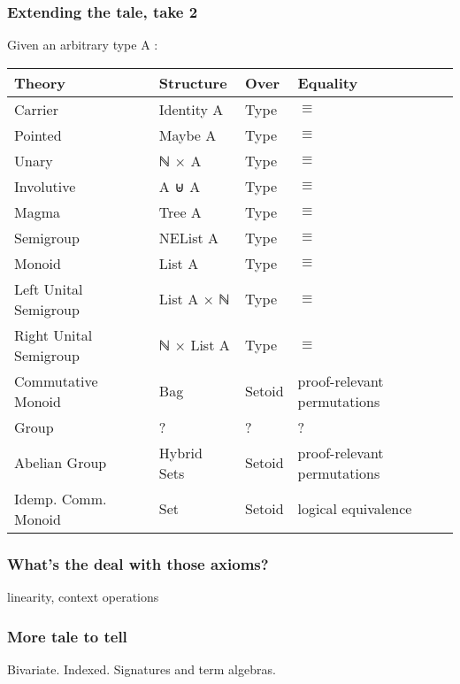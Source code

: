\documentclass[serif,mathserif,professionalfont,10pt]{beamer}
\begin{document}
\begin{frame}
\frametitle{Extending the tale, take 2}
Given an arbitrary type A : \\ \vspace*{4mm}
\begin{tabular}{llll}
\textbf{Theory} & \textbf{Structure} & Over & Equality \\ \hline
Carrier & Identity A & Type  & $\equiv$ \\
Pointed & Maybe A & Type & $\equiv$\\ \hline
Unary & ℕ × A &  Type & $\equiv$\\
Involutive & A ⊎ A & Type & $\equiv$ \\ \hline
Magma & Tree A &  Type & $\equiv$\\
Semigroup & NEList A & Type & $\equiv$\\ \hline
Monoid & List A & Type & $\equiv$\\
Left Unital Semigroup & List A × ℕ & Type & $\equiv$\\
Right Unital Semigroup & ℕ × List A & Type & $\equiv$\\ \hline
Commutative Monoid & Bag & Setoid &  proof-relevant permutations \\
Group & ? & ? & ? \\
Abelian Group & Hybrid Sets & Setoid &  proof-relevant permutations\\
Idemp. Comm. Monoid & Set & Setoid &  logical equivalence \\
\end{tabular}
\end{frame}

\begin{frame}
\frametitle{What's the deal with those axioms?}
linearity, context operations
\end{frame}

\begin{frame}
\frametitle{More tale to tell}
Bivariate. Indexed. Signatures and term algebras.
\end{frame}
\end{document}
